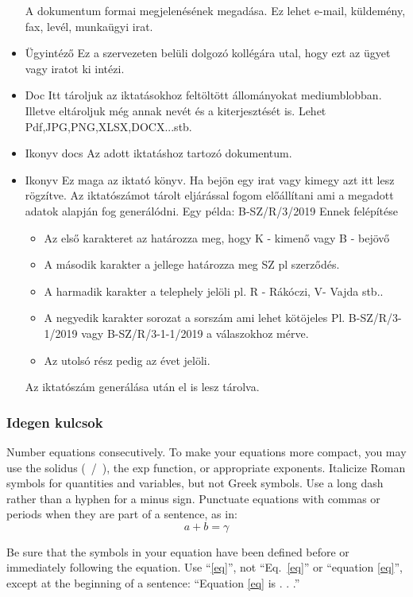 \documentclass[conference]{IEEEtran}
\begin{document}
\begin{itemize}
	A dokumentum formai megjelenésének megadása. Ez lehet e-mail, küldemény, fax, levél, munkaügyi irat.
	\item Ügyintéző	
	Ez a szervezeten belüli dolgozó kollégára utal, hogy ezt az ügyet vagy iratot ki intézi.
	\item Doc
	Itt tároljuk az iktatásokhoz feltöltött állományokat mediumblobban. Illetve eltároljuk még annak nevét és a kiterjesztését is. Lehet Pdf,JPG,PNG,XLSX,DOCX...stb.
	\item Ikonyv docs
	Az adott iktatáshoz tartozó dokumentum.
	\item Ikonyv
	Ez maga az iktató könyv. Ha bejön egy irat vagy kimegy azt itt lesz rögzítve. Az iktatószámot tárolt eljárással fogom előállítani ami a megadott adatok alapján fog generálódni. Egy példa: B-SZ/R/3/2019 Ennek felépítése
	\begin{itemize}
		\item Az első karakteret az határozza meg, hogy K - kimenő vagy B - bejövő
		\item A második karakter a jellege határozza meg SZ pl szerződés.
		\item A harmadik karakter a telephely jelöli pl. R - Rákóczi, V- Vajda stb..
		\item A negyedik karakter sorozat a sorszám ami lehet kötöjeles Pl. B-SZ/R/3-1/2019 vagy B-SZ/R/3-1-1/2019 a válaszokhoz mérve.
		\item Az utolsó rész pedig az évet jelöli.
		
	\end{itemize}
	Az iktatószám generálása után el is lesz tárolva.
	
\end{itemize}
\subsubsection{Idegen kulcsok}
Number equations consecutively. To make your 
equations more compact, you may use the solidus (~/~), the exp function, or 
appropriate exponents. Italicize Roman symbols for quantities and variables, 
but not Greek symbols. Use a long dash rather than a hyphen for a minus 
sign. Punctuate equations with commas or periods when they are part of a 
sentence, as in:
\begin{equation}
a+b=\gamma\label{eq}
\end{equation}

Be sure that the 
symbols in your equation have been defined before or immediately following 
the equation. Use ``\eqref{eq}'', not ``Eq.~\eqref{eq}'' or ``equation \eqref{eq}'', except at 
the beginning of a sentence: ``Equation \eqref{eq} is . . .''
\end{document}
